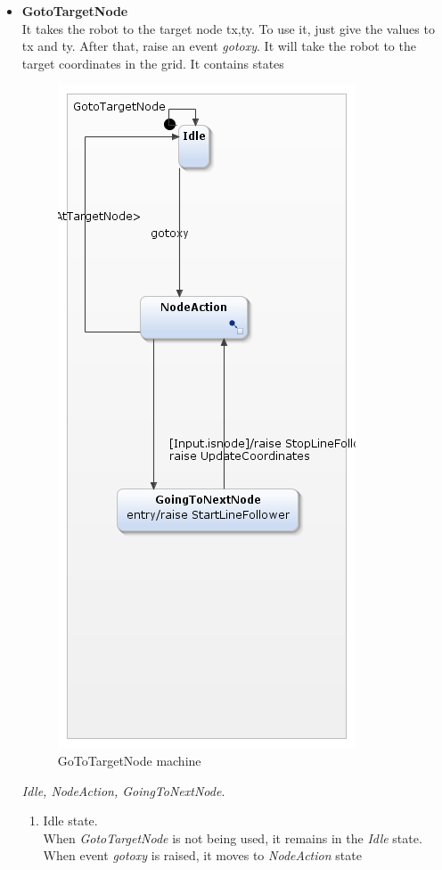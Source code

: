 \documentclass[a4paper,12pt,oneside]{book}
\begin{document}
\begin{itemize}
\item \textbf{GotoTargetNode}\\
It takes the robot to the target node tx,ty. To use it, just give the values to tx and ty. After that, raise an event \textit{gotoxy}. It will take the robot to the target coordinates in the grid. It contains states
	\begin{figure}[h]
	\centering
	\includegraphics[scale=.6]{GoToTargetNode.png}
	\caption{GoToTargetNode machine}
\end{figure}
 \textit{Idle, NodeAction, GoingToNextNode}. 
\begin{enumerate}
\item  Idle state.\\
When \textit{GotoTargetNode} is not being used, it remains in the \textit{Idle} state. When event \textit{gotoxy} is raised, it moves to \textit{NodeAction} state

\end{enumerate}
\end{itemize}
\end{document}
